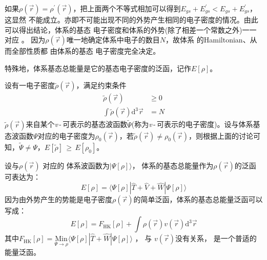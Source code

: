 {如果}$\rho(\vec{r})\!=\!\rho^{\prime}(\vec{r})$，把上面两个不等式相加可以得到$E_{gs}+E^{\prime}_{gs}\!<\!E_{gs}+E^{\prime}_{gs}$，这显然%
{不能成立。亦即不可能出现不同的外势产生相同的电子密度的情况}。由此可以得出结论，体系的基态%
{电}子密度和体系的外势(除了相差一个常数之外)一一对应%
{。}%
{因为$\rho(\vec r)$唯一地确定体系中电子的数目$N$，故}体系%
{%
的\textrm{Hamiltonian}、从而全部}性质都%
由体系的基态%
{电}子密度完全决定。{特殊地，体系基态总能量是它的基态电子密度的泛函，记作$E[\rho]$。
	
设有一电子密度$\tilde\rho(\vec r)$，满足约束条件
\begin{displaymath}
	\begin{aligned}
		\tilde\rho(\vec r)\!&\geqslant\!0\\
		\int\tilde\rho(\vec r)\textrm{d}^3\vec r&\!=\!N
	\end{aligned}
\end{displaymath}
$\tilde\rho(\vec r)$来自某个\textit{v}\,-\,可表示的基态波函数$\tilde\Psi$(称为\textit{v}\,-\,可表示的电子密度)。设与体系基态波函数$\Psi$对应的电子密度为$\rho_0(\vec r)$，若$\tilde\rho(\vec r)\!\neq\!\rho_0(\vec r)$，则根据上面的讨论可知，$\tilde\Psi\!\neq\!\Psi$，$E[\tilde\rho]$\,$\geqslant$\,$E[\rho_0]$。}

{设}与$\rho(\vec{r})$%
对应的%
体系波函数为$|\Psi[\rho]\rangle$，%
体系的基态总能量作为$\rho(\vec{r})
$的泛函%
{可表达}为：
\begin{equation}
	E[\rho]=\langle\Psi[\rho]|\hat{T}+\hat{V}+\hat{W}|\Psi[\rho]\rangle
	\label{eq:DFT_02}
\end{equation}
{因为由外势产生的势能是电子密度$\rho(\vec r)$的简单泛函，}体系的{基态}总能量泛函可以写成：
\begin{equation}
	E[\rho]=F_{\mathrm{HK}}[\rho]+\int\rho(\vec{r})v(\vec{r})\textrm{d}^3\vec{r}
	\label{eq:DFT_03}
\end{equation}
其中$F_{\mathrm{HK}}[\rho]=\underset{\Psi\to\rho}{\mathrm{Min}}\langle\Psi[\rho]|\hat{T}+\hat{W}|\Psi[\rho]\rangle$%
{，}%
与%
{$v(\vec r)$}没有关系，%
{是一个普适的能量泛函。}

